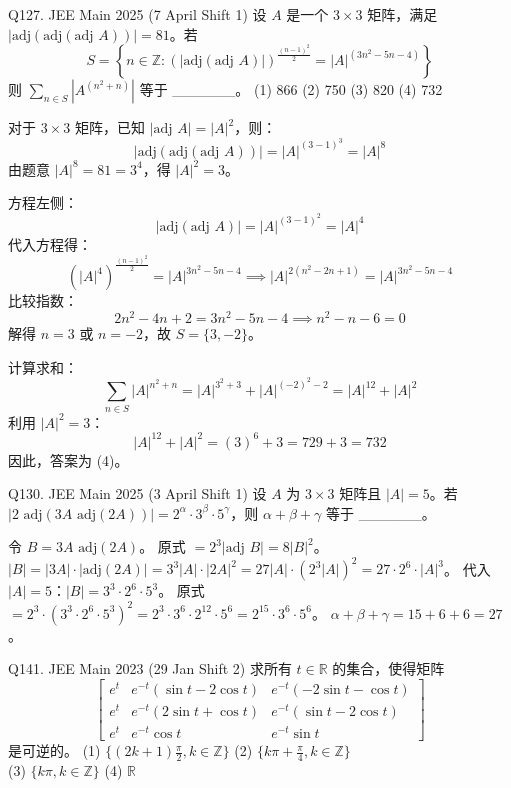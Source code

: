 \begin{questions}
\question
Q127. JEE Main 2025 (7 April Shift 1)
设 $A$ 是一个 $3 \times 3$ 矩阵，满足 $|\text{adj}(\text{adj}(\text{adj } A))| = 81$。若
\[
S = \left\{ n \in \mathbb{Z} : (|\text{adj}(\text{adj } A)|)^{\frac{(n-1)^2}{2}} = |A|^{(3n^2 - 5n - 4)} \right\}
\]
则 $\sum_{n \in S} |A^{(n^2 + n)}|$ 等于 \_\_\_\_\_\_。
(1) 866 \quad (2) 750 \quad (3) 820 \quad (4) 732

\begin{solution}
对于 $3 \times 3$ 矩阵，已知 $|\text{adj } A| = |A|^2$，则：
\[
|\text{adj}(\text{adj}(\text{adj } A))| = |A|^{(3-1)^3} = |A|^8
\]
由题意 $|A|^8 = 81 = 3^4$，得 $|A|^2 = 3$。

方程左侧：
\[
|\text{adj}(\text{adj } A)| = |A|^{(3-1)^2} = |A|^4
\]
代入方程得：
\[
(|A|^4)^{\frac{(n-1)^2}{2}} = |A|^{3n^2 - 5n - 4} \implies |A|^{2(n^2 - 2n + 1)} = |A|^{3n^2 - 5n - 4}
\]
比较指数：
\[
2n^2 - 4n + 2 = 3n^2 - 5n - 4 \implies n^2 - n - 6 = 0
\]
解得 $n = 3$ 或 $n = -2$，故 $S = \{3, -2\}$。

计算求和：
\[
\sum_{n \in S} |A|^{n^2+n} = |A|^{3^2+3} + |A|^{(-2)^2-2} = |A|^{12} + |A|^2
\]
利用 $|A|^2 = 3$：
\[
|A|^{12} + |A|^2 = (3)^6 + 3 = 729 + 3 = 732
\]
因此，答案为 (4)。
\end{solution}

\question
Q130. JEE Main 2025 (3 April Shift 1)
设 $A$ 为 $3 \times 3$ 矩阵且 $|A| = 5$。若 $|2 \text{ adj}(3 A \text{ adj}(2 A))| = 2^{\alpha} \cdot 3^{\beta} \cdot 5^{\gamma}$，则 $\alpha + \beta + \gamma$ 等于 \_\_\_\_\_\_。

\begin{solution}
令 $B = 3A \text{ adj}(2A)$。
原式 $= 2^3 |\text{adj } B| = 8 |B|^2$。
$|B| = |3A| \cdot |\text{adj}(2A)| = 3^3 |A| \cdot |2A|^2 = 27 |A| \cdot (2^3 |A|)^2 = 27 \cdot 2^6 \cdot |A|^3$。
代入 $|A|=5$：$|B| = 3^3 \cdot 2^6 \cdot 5^3$。
原式 $= 2^3 \cdot (3^3 \cdot 2^6 \cdot 5^3)^2 = 2^3 \cdot 3^6 \cdot 2^{12} \cdot 5^6 = 2^{15} \cdot 3^6 \cdot 5^6$。
$\alpha+\beta+\gamma = 15+6+6 = 27$。
\end{solution}

\question
Q141. JEE Main 2023 (29 Jan Shift 2)
求所有 $t \in \mathbb{R}$ 的集合，使得矩阵
\[
\begin{bmatrix} 
e^t & e^{-t}(\sin t - 2 \cos t) & e^{-t}(-2 \sin t - \cos t) \\ 
e^t & e^{-t}(2 \sin t + \cos t) & e^{-t}(\sin t - 2 \cos t) \\ 
e^t & e^{-t} \cos t & e^{-t} \sin t 
\end{bmatrix}
\]
是可逆的。
(1) $\{(2k + 1)\frac{\pi}{2}, k \in \mathbb{Z}\}$ \quad (2) $\{k\pi + \frac{\pi}{4}, k \in \mathbb{Z}\}$ \\
(3) $\{k\pi, k \in \mathbb{Z}\}$ \quad (4) $\mathbb{R}$


\end{questions}
